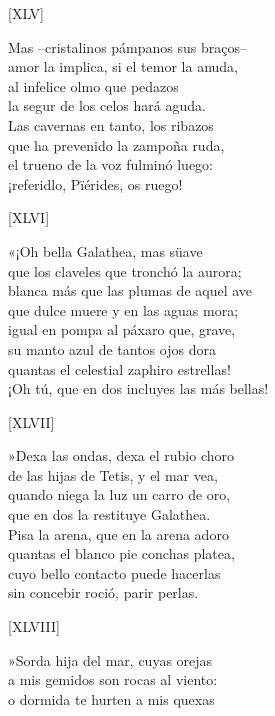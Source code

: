 \documentclass[11pt,a4paper,twoside]{article}
\begin{document}
%
\begin{center}
	[XLV]
\end{center}\pstart
Mas --cristalinos pámpanos sus braços--\\
amor la implica, si el temor la anuda,\\
al infelice olmo que pedazos\\
la segur de los celos hará aguda.\\
Las cavernas en tanto, los ribazos\\
que ha prevenido la zampoña ruda,\\
el trueno de la voz fulminó luego:\\
¡referidlo, Pïérides, os ruego!\par\pend
%
\begin{center}
	[XLVI]
\end{center}\pstart
«¡Oh bella Galathea, mas süave\\
que los claveles que tronchó la aurora;\\
blanca más que las plumas de aquel ave\\
que dulce muere y en las aguas mora;\\
igual en pompa al páxaro que, grave,\\
su manto azul de tantos ojos dora\\
quantas el celestial zaphiro estrellas!\\
¡Oh tú, que en dos incluyes las más bellas!\par\pend
%
\begin{center}
	[XLVII]
\end{center}\pstart
»Dexa las ondas, dexa el rubio choro\\
de las hijas de Tetis, y el mar vea,\\
quando niega la luz un carro de oro,\\
que en dos la restituye Galathea.\\
Pisa la arena, que en la arena adoro\\
quantas el blanco pie conchas platea,\\
cuyo bello contacto puede hacerlas\\
sin concebir roció, parir perlas.\par\pend
%
\begin{center}
	[XLVIII]
\end{center}\pstart
»Sorda hija del mar, cuyas orejas\\
a mis gemidos son rocas al viento:\\
o dormida te hurten a mis quexas\\
\end{document}
